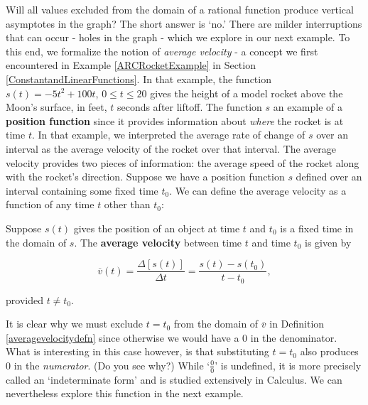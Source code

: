 \begin{ex}
Will all  values excluded from the domain of a rational function produce vertical asymptotes in the graph?  The short answer is `no.'  There are milder interruptions that can occur - holes in the graph - which we explore in our next example.  To this end, we formalize the notion of \textit{average velocity} - a concept we first encountered in  Example \ref{ARCRocketExample} in Section \ref{ConstantandLinearFunctions}. In that example, the function $s(t) = -5t^2+100t$, $0 \leq t \leq 20$ gives the height of a model rocket above the Moon's surface, in feet,  $t$ seconds after liftoff.  The function $s$ an example of a \textbf{position function} since it provides information about \textit{where} the rocket is at time $t$.   In that example, we interpreted the average rate of change of $s$ over an interval as the average velocity of the rocket over that interval.  The average velocity provides two pieces of information:  the average speed of the rocket along with the rocket's direction.  Suppose we have a position function $s$ defined over an interval containing some fixed time $t_{0}$.  We can define the average velocity as a function of any time $t$ other than $t_{0}$:

\begin{tcolorbox}

\begin{defn} \label{averagevelocitydefn} Suppose $s(t)$ gives the position of an object at time $t$ and $t_{0}$ is a fixed time in the domain of $s$.  The \textbf{average velocity} between time $t$ and time $t_{0}$ is given by

\[ \overline{v}(t) = \dfrac{\Delta [s(t)]}{\Delta t} = \dfrac{s(t) - s(t_{0})}{t - t_{0}}, \]

provided $t \neq t_{0}$.

\end{defn}

\end{tcolorbox}

It is clear why we must exclude $t = t_{0}$ from the domain of $\overline{v}$ in Definition \ref{averagevelocitydefn} since otherwise we would have a $0$ in the denominator.  What is interesting in this case however, is that substituting $t = t_{0}$ also produces $0$ in the \textit{numerator}. (Do you see why?)  While `$\frac{0}{0}$' is undefined, it is more precisely called an `indeterminate form' and is studied extensively in Calculus.  We can nevertheless explore this function in the next example.


\end{ex}
